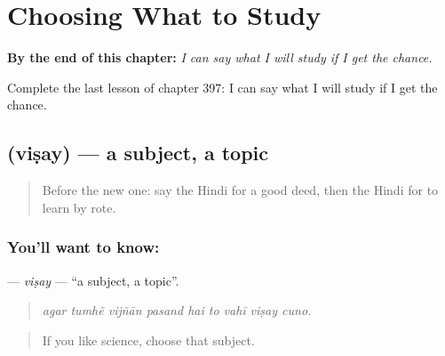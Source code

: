 
\chapter{Choosing What to Study}
\label{ch:hi-choosing-what-to-study}

\begin{chapteropening}
\textbf{By the end of this chapter:} \emph{I can say what I will study if I get the chance.}

Complete the last lesson of chapter 397: I can say what I will study if I get the chance.
\end{chapteropening}

\section[\texorpdfstring{\hi{विषय} (viṣay)}{विषय (viṣay)}]{ (viṣay) — a subject, a topic}

\label{lesson:HI-C397-visay}



\begin{quote}
Before the new one: say the Hindi for a good deed, then the Hindi for to learn by rote.
\end{quote}

\subsection*{You'll want to know: }
\textbf{} — \emph{viṣay} — \textquotedblleft{}a subject, a topic\textquotedblright{}.

\begin{quote}
        
\end{quote}

\begin{quote}
\emph{agar tumhẽ vijñān pasand hai to vahī viṣay cuno.}
\end{quote}

\begin{quote}
If you like science, choose that subject.
\end{quote}

